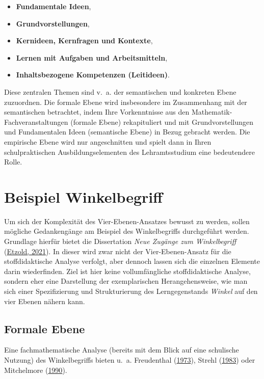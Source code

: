 \documentclass[
]{scrbook}
\providecommand{\tightlist}{%
  \setlength{\itemsep}{0pt}\setlength{\parskip}{0pt}}
\theoremstyle{definition}
\theoremstyle{definition}
\theoremstyle{definition}
\theoremstyle{definition}
\theoremstyle{remark}
\begin{document}
\begin{itemize}
\tightlist
\item
  \textbf{Fundamentale Ideen},
\item
  \textbf{Grundvorstellungen},
\item
  \textbf{Kernideen, Kernfragen und Kontexte},
\item
  \textbf{Lernen mit Aufgaben und Arbeitsmitteln},
\item
  \textbf{Inhaltsbezogene Kompetenzen (Leitideen)}.
\end{itemize}

Diese zentralen Themen sind v.~a. der \textcolor{semanticColor}{semantischen} und \textcolor{concreteColor}{konkreten} Ebene zuzuordnen. Die \textcolor{formalColor}{formale} Ebene wird insbesondere im Zusammenhang mit der semantischen betrachtet, indem Ihre Vorkenntnisse aus den Mathematik-Fachveranstaltungen (formale Ebene) rekapituliert und mit Grundvorstellungen und Fundamentalen Ideen (semantische Ebene) in Bezug gebracht werden. Die \textcolor{empiricColor}{empirische} Ebene wird nur angeschnitten und spielt dann in Ihren schulpraktischen Ausbildungselementen des Lehramtsstudium eine bedeutendere Rolle.

\hypertarget{beispiel-winkelbegriff}{%
\section{Beispiel Winkelbegriff}\label{beispiel-winkelbegriff}}

Um sich der Komplexität des Vier-Ebenen-Ansatzes bewusst zu werden, sollen mögliche Gedankengänge am Beispiel des Winkelbegriffs durchgeführt werden. Grundlage hierfür bietet die Dissertation \emph{Neue Zugänge zum Winkelbegriff} (\protect\hyperlink{ref-Etzold2021}{Etzold, 2021}). In dieser wird zwar nicht der Vier-Ebenen-Ansatz für die stoffdidaktische Analyse verfolgt, aber dennoch lassen sich die einzelnen Elemente darin wiederfinden. Ziel ist hier keine vollumfängliche stoffdidaktische Analyse, sondern eher eine Darstellung der exemplarischen Herangehensweise, wie man sich einer Spezifizierung und Strukturierung des Lerngegenstands \emph{Winkel} auf den vier Ebenen nähern kann.

\hypertarget{formale-ebene}{%
\subsection{Formale Ebene}\label{formale-ebene}}

Eine fachmathematische Analyse (bereits mit dem Blick auf eine schulische Nutzung) des Winkelbegriffs bieten u.~a. Freudenthal (\protect\hyperlink{ref-Freudenthal:1973}{1973}), Strehl (\protect\hyperlink{ref-Strehl:1983}{1983}) oder Mitchelmore (\protect\hyperlink{ref-Mitchelmore:1990}{1990}).
\end{document}
